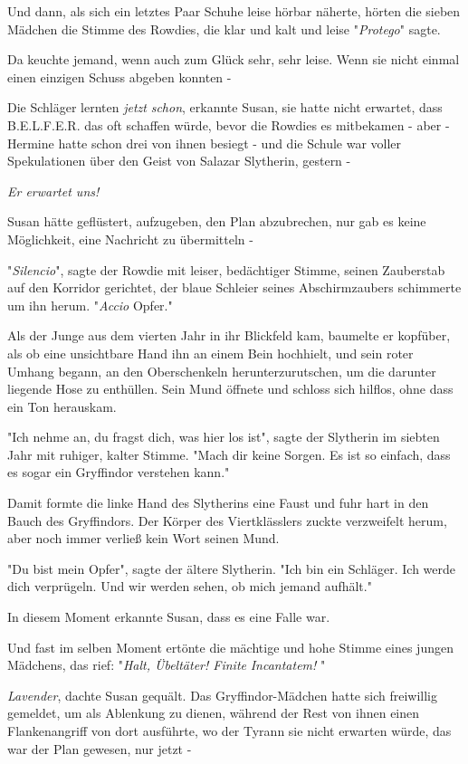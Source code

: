 {Und dann, als sich ein letztes Paar Schuhe leise hörbar näherte, hörten die sieben Mädchen die Stimme des Rowdies, die klar und kalt und leise "\emph{Protego}" sagte.

Da keuchte jemand, wenn auch zum Glück sehr, sehr leise. Wenn sie nicht einmal einen einzigen Schuss abgeben konnten -

Die Schläger lernten \emph{jetzt} \emph{schon}, erkannte Susan, sie hatte nicht erwartet, dass B.E.L.F.E.R. das oft schaffen würde, bevor die Rowdies es mitbekamen - aber - Hermine hatte schon drei von ihnen besiegt - und die Schule war voller Spekulationen über den Geist von Salazar Slytherin, gestern -

\emph{Er erwartet uns!}

Susan hätte geflüstert, aufzugeben, den Plan abzubrechen, nur gab es keine Möglichkeit, eine Nachricht zu übermitteln -

"\emph{Silencio}", sagte der Rowdie mit leiser, bedächtiger Stimme, seinen Zauberstab auf den Korridor gerichtet, der blaue Schleier seines Abschirmzaubers schimmerte um ihn herum. "\emph{Accio} Opfer."

Als der Junge aus dem vierten Jahr in ihr Blickfeld kam, baumelte er kopfüber, als ob eine unsichtbare Hand ihn an einem Bein hochhielt, und sein roter Umhang begann, an den Oberschenkeln herunterzurutschen, um die darunter liegende Hose zu enthüllen. Sein Mund öffnete und schloss sich hilflos, ohne dass ein Ton herauskam.

"Ich nehme an, du fragst dich, was hier los ist", sagte der Slytherin im siebten Jahr mit ruhiger, kalter Stimme. "Mach dir keine Sorgen. Es ist so einfach, dass es sogar ein Gryffindor verstehen kann."

Damit formte die linke Hand des Slytherins eine Faust und fuhr hart in den Bauch des Gryffindors. Der Körper des Viertklässlers zuckte verzweifelt herum, aber noch immer verließ kein Wort seinen Mund.

"Du bist mein Opfer", sagte der ältere Slytherin. "Ich bin ein Schläger. Ich werde dich verprügeln. Und wir werden sehen, ob mich jemand aufhält."

In diesem Moment erkannte Susan, dass es eine Falle war.

Und fast im selben Moment ertönte die mächtige und hohe Stimme eines jungen Mädchens, das rief: "\emph{Halt, Übeltäter! Finite} \emph{Incantatem!} "

\emph{Lavender}, dachte Susan gequält. Das Gryffindor-Mädchen hatte sich freiwillig gemeldet, um als Ablenkung zu dienen, während der Rest von ihnen einen Flankenangriff von dort ausführte, wo der Tyrann sie nicht erwarten würde, das war der Plan gewesen, nur jetzt -

}
